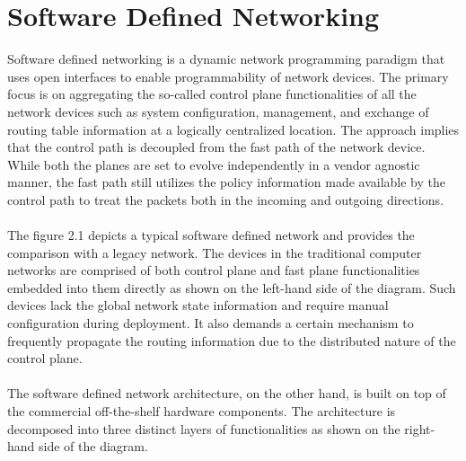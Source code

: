 \section{Software Defined Networking}
Software defined networking is a dynamic network programming paradigm that uses open interfaces to enable programmability of network devices. The primary focus is on aggregating the so-called control plane functionalities of all the network devices such as system configuration, management, and exchange of routing table information at a logically centralized location. The approach implies that the control path is decoupled from the fast path of the network device. While both the planes are set to evolve independently in a vendor agnostic manner, the fast path still utilizes the policy information made available by the control path to treat the packets both in the incoming and outgoing directions.\\\\The  figure 2.1 depicts a typical software defined network and provides the comparison with a legacy network. The devices in the traditional computer networks are comprised of both control plane and fast plane functionalities embedded into them directly as shown on the left-hand side of the diagram. Such devices lack the global network state information and require manual configuration during deployment. It also demands a certain mechanism to frequently propagate the routing information due to the distributed nature of the control plane.\\\\ The software defined network architecture, on the other hand, is built on top of the commercial off-the-shelf hardware components. The architecture is decomposed into three distinct layers of functionalities as shown on the right-hand side of the diagram.\\
